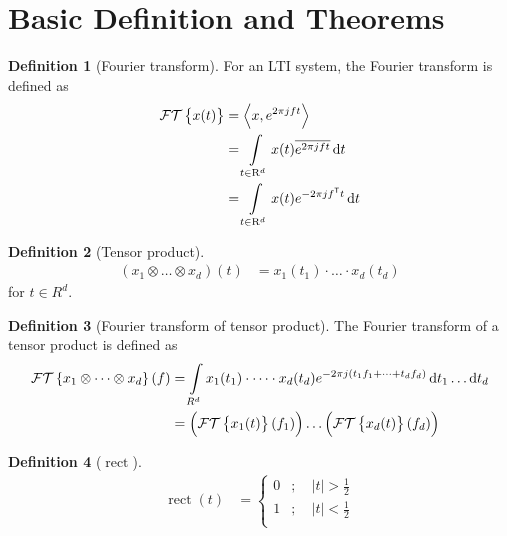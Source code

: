 \documentclass[titlepage, fleqn, a4paper, 12pt, twoside]{article}
\theoremstyle{definition}
\newtheorem{definition}{Definition}
\theoremstyle{theorem}
\DeclareMathOperator{\FT}{\mathcal{FT}}
\DeclareMathOperator{\rect}{\mathrm{rect}}
\def\transpose#1{{#1}^{\mathsf{T}}}
\begin{document}
\part{Basic Definition and Theorems}

\begin{definition}[Fourier transform]
	For an LTI system, the Fourier transform is defined as
	\begin{align*}
		\FT\left\{ x(t) \right\} &= \left\langle x,e^{2 \pi j f t} \right\rangle\\
		&= \int\limits_{t \in \mathrm{R}^d} x(t) \overline{e^{2 \pi j f t}} \dif t\\
		&= \int\limits_{t \in \mathrm{R}^d} x(t) e^{-2 \pi j \transpose{f} t} \dif t
	\end{align*}
	\label{def:Fourier_transform}
\end{definition}

\begin{definition}[Tensor product]
	\begin{align*}
		(x_1 \otimes \dots \otimes x_d)(t) &= x_1(t_1) \cdot \dots \cdot x_d(t_d)
	\end{align*}
	for $t \in R^d$.
\end{definition}

\begin{definition}[Fourier transform of tensor product]
	The Fourier transform of a tensor product is defined as
	\begin{align*}
		\FT\left\{ x_1 \otimes \dots \otimes x_d \right\}(f) &= \int\limits_{R^d} x_1(t_1) \cdot \dots \cdot x_d(t_d) e^{-2 \pi j (t_1 f_1 + \dots + t_d f_d)} \dif t_1 \dots \dif t_d\\
		&= \left( \FT\left\{ x_1(t) \right\}(f_1) \right) \dots \left( \FT\left\{ x_d(t) \right\}(f_d) \right)
	\end{align*}
\end{definition}

\begin{definition}[$\rect$]
	\begin{align*}
		\rect(t) &=
			\begin{cases}
				0 &;\quad |t| > \frac{1}{2}\\
				1 &;\quad |t| < \frac{1}{2}\\
			\end{cases}
	\end{align*}
\end{definition}
\end{document}
